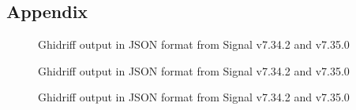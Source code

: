

\begin{appendices}
\chapter{Appendix}
\newpage

\begin{figure}[H]
    \centering
    
    \caption{Ghidriff output in JSON format from Signal v7.34.2 and v7.35.0}
    \label{fig:ghidriff_json_output_A}
\end{figure}

\begin{figure}[H]
    \centering
    
    \caption{Ghidriff output in JSON format from Signal v7.34.2 and v7.35.0}
    \label{fig:ghidriff_json_output_B}
\end{figure}

\begin{figure}[H]
    \centering
    
    \caption{Ghidriff output in JSON format from Signal v7.34.2 and v7.35.0}
    \label{fig:ghidriff_json_output_C}
\end{figure}


\end{appendices}
